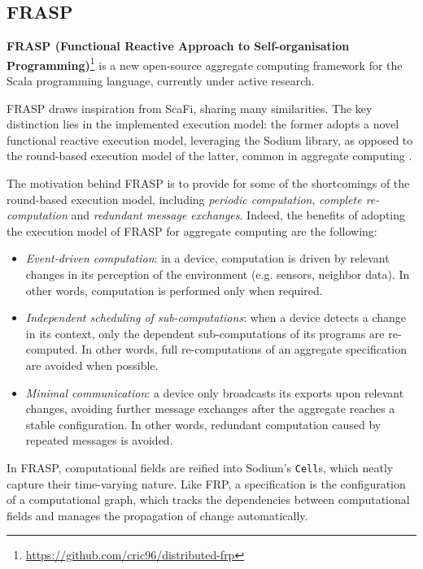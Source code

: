 
\subsection{FRASP}

\textbf{FRASP (Functional Reactive Approach to Self-organisation Programming)}\footnote{\url{https://github.com/cric96/distributed-frp}}
is a new open-source aggregate computing framework for the Scala programming
language, currently under active research.

FRASP draws inspiration from \ac{ScaFi}, sharing many similarities. The key
distinction lies in the implemented execution model: the former adopts a novel
functional reactive execution model, leveraging the Sodium library, as opposed
to the round-based execution model of the latter, common in aggregate computing
\cite{FRASP}.

The motivation behind FRASP is to provide for some of the shortcomings of the
round-based execution model, including \textit{periodic computation},
\textit{complete re-computation} and \textit{redundant message exchanges}.
Indeed, the benefits of adopting the execution model of FRASP for aggregate
computing are the following:
\begin{itemize}
  \item \textit{Event-driven computation}: in a device, computation is driven
        by relevant changes in its perception of the environment (e.g.
        sensors, neighbor data). In other words, computation is performed only
        when required.
  \item \textit{Independent scheduling of sub-computations}: when a device
        detects a change in its context, only the dependent sub-computations
        of its programs are re-computed. In other words, full re-computations
        of an aggregate specification are avoided when possible.
  \item \textit{Minimal communication}: a device only broadcasts its exports
        upon relevant changes, avoiding further message exchanges after the
        aggregate reaches a stable configuration. In other words, redundant
        computation caused by repeated messages is avoided.
\end{itemize}

In FRASP, computational fields are reified into Sodium's \texttt{Cell}s, which
neatly capture their time-varying nature. Like \ac{FRP}, a specification is the
configuration of a computational graph, which tracks the dependencies between
computational fields and manages the propagation of change automatically.


